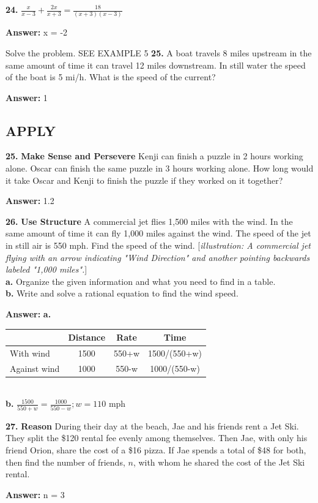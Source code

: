 \documentclass{article}
\newenvironment{practice}[2]{\textbf{#1.}}{\vspace{1em}}
\newcommand{\answer}[1]{\par\textbf{Answer:} #1}
\newcommand{\placeholder}[2]{[\textit{#1: #2}]}
\begin{document}
\begin{practice}{24}{DOK}
$\frac{x}{x-3} + \frac{2x}{x+3} = \frac{18}{(x+3)(x-3)}$
\answer{x = -2}
\end{practice}

Solve the problem. SEE EXAMPLE 5
\begin{practice}{25}{DOK}
A boat travels 8 miles upstream in the same amount of time it can travel 12 miles downstream. In still water the speed of the boat is 5 mi/h. What is the speed of the current?
\answer{1 }
\end{practice}

\subsection*{APPLY}
\begin{practice}{25}{DOK}
\textbf{Make Sense and Persevere} Kenji can finish a puzzle in 2 hours working alone. Oscar can finish the same puzzle in 3 hours working alone. How long would it take Oscar and Kenji to finish the puzzle if they worked on it together?
\answer{1.2 }
\end{practice}

\begin{practice}{26}{DOK}
\textbf{Use Structure} A commercial jet flies 1,500 miles with the wind. In the same amount of time it can fly 1,000 miles against the wind. The speed of the jet in still air is 550 mph. Find the speed of the wind.
\placeholder{illustration}{A commercial jet flying with an arrow indicating "Wind Direction" and another pointing backwards labeled "1,000 miles".} \\
\textbf{a.} Organize the given information and what you need to find in a table. \\
\textbf{b.} Write and solve a rational equation to find the wind speed.
\answer{
\textbf{a.} 
\begin{tabular}{|l|c|c|c|}
\hline
& Distance & Rate & Time \\
\hline
With wind & 1500 & 550+w & 1500/(550+w) \\
Against wind & 1000 & 550-w & 1000/(550-w) \\
\hline
\end{tabular} \\
\textbf{b.} $\frac{1500}{550+w} = \frac{1000}{550-w}; w = 110 \text{ mph}$
}
\end{practice}

\begin{practice}{27}{DOK}
\textbf{Reason} During their day at the beach, Jae and his friends rent a Jet Ski. They split the \$120 rental fee evenly among themselves. Then Jae, with only his friend Orion, share the cost of a \$16 pizza. If Jae spends a total of \$48 for both, then find the number of friends, $n$, with whom he shared the cost of the Jet Ski rental.
\answer{n = 3}
\end{practice}
\end{document}
